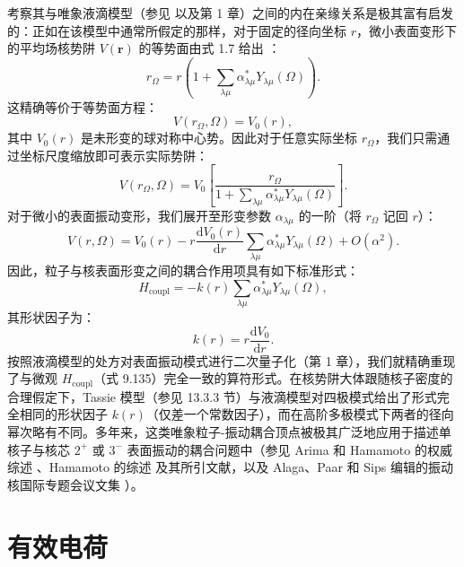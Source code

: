 考察其与唯象液滴模型（参见 \cite{BM75} 以及第 1 章）之间的内在亲缘关系是极其富有启发的：正如在该模型中通常所假定的那样，对于固定的径向坐标
$r$，微小表面变形下的平均场核势阱 $V(\boldsymbol{r})$ 的等势面由式 1.7 给出 \cite{Ha74a}：
\begin{equation}
r_{\Omega}=r\left(1+\sum_{\lambda\mu}\alpha^{*}_{\lambda\mu}Y_{\lambda\mu}(\Omega)\right).\label{eq:9.144}
\end{equation}
这精确等价于等势面方程：
\begin{equation}
V(r_{\Omega},\Omega)=V_{0}(r),\label{eq:9.145}
\end{equation}
其中 $V_{0}(r)$ 是未形变的球对称中心势。因此对于任意实际坐标 $r_{\Omega}$，我们只需通过坐标尺度缩放即可表示实际势阱：
\begin{equation}
V(r_{\Omega},\Omega)=V_{0}\left[\frac{r_{\Omega}}{1+\sum_{\lambda\mu}\alpha^{*}_{\lambda\mu}Y_{\lambda\mu}(\Omega)}\right].\label{eq:9.146}
\end{equation}
对于微小的表面振动变形，我们展开至形变参数 $\alpha_{\lambda\mu}$ 的一阶（将 $r_{\Omega}$ 记回
$r$）：
\begin{equation}
V(r,\Omega)=V_{0}(r)-r\frac{\mathrm{d}V_{0}(r)}{\mathrm{d}r}\sum_{\lambda\mu}\alpha^{*}_{\lambda\mu}Y_{\lambda\mu}(\Omega)+O(\alpha^{2}).\label{eq:9.147}
\end{equation}
因此，粒子与核表面形变之间的耦合作用项具有如下标准形式：
\begin{equation}
H_{\text{coupl}}=-k(r)\sum_{\lambda\mu}\alpha^{*}_{\lambda\mu}Y_{\lambda\mu}(\Omega),\label{eq:9.148}
\end{equation}
其形状因子为：
\begin{equation}
k(r)=r\frac{\mathrm{d}V_{0}}{\mathrm{d}r}.\label{eq:9.149}
\end{equation}
按照液滴模型的处方对表面振动模式进行二次量子化（第 1 章），我们就精确重现了与微观 $H_{\text{coupl}}$（式 9.135）完全一致的算符形式。在核势阱大体跟随核子密度的合理假定下，Tassie
模型（参见 13.3.3 节）与液滴模型对四极模式给出了形式完全相同的形状因子 $k(r)$（仅差一个常数因子），而在高阶多极模式下两者的径向幂次略有不同。多年来，这类唯象粒子-振动耦合顶点被极其广泛地应用于描述单核子与核芯
$2^{+}$ 或 $3^{-}$ 表面振动的耦合问题中（参见 Arima 和 Hamamoto 的权威综述 \cite{AH71b}、Hamamoto
的综述 \cite{Ha74a} 及其所引文献，以及 Alaga、Paar 和 Sips 编辑的振动核国际专题会议文集 \cite{APS75}）。

\section{\label{sec:9.3.5}有效电荷}

